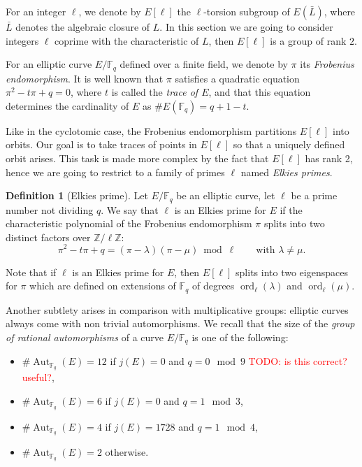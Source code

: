 \documentclass[12pt]{article}
\theoremstyle{plain}
\theoremstyle{definition}
\newtheorem{definition}[theorem]{Definition}
\newcommand{\todo}[1]{\textcolor{red}{TODO: #1}}
\DeclareMathOperator{\order}{ord} %
\DeclareMathOperator{\Aut}{Aut}
\def\Z{\ensuremath{\mathbb{Z}}}
\def\F{\ensuremath{\mathbb{F}}}
\begin{document}
For an integer $\ell$, we denote by $E[\ell]$ the $\ell$-torsion
subgroup of $E(\bar{L})$, where $\bar{L}$ denotes the algebraic
closure of $L$. In this section we are going to consider integers
$\ell$ coprime with the characteristic of $L$, then $E[\ell]$ is a
group of rank $2$.

For an elliptic curve $E/\F_q$ defined over a finite field, we denote
by $\pi$ its \emph{Frobenius endomorphism}. It is well known that
$\pi$ satisfies a quadratic equation $\pi^2-t\pi+q=0$, where $t$ is
called the \emph{trace of $E$}, and that this equation determines the
cardinality of $E$ as $\#E(\F_q)=q+1-t$.

Like in the cyclotomic case, the Frobenius endomorphism partitions
$E[\ell]$ into orbits. Our goal is to take traces of points in
$E[\ell]$ so that a uniquely defined orbit arises. This task is made
more complex by the fact that $E[\ell]$ has rank 2, hence we are going
to restrict to a family of primes $\ell$ named \emph{Elkies primes}.

\begin{definition}[Elkies prime]
  Let $E/\F_q$ be an elliptic curve, let $\ell$ be a prime number not
  dividing $q$.  We say that $\ell$ is an Elkies prime for $E$ if the
  characteristic polynomial of the Frobenius endomorphism $\pi$ splits
  into two distinct factors over $\Z/\ell\Z$:
\begin{equation}
\pi^2-t\pi+q=(\pi-\lambda)(\pi-\mu)\bmod\ell
\qquad\text{with $\lambda\ne\mu$}.
\end{equation}
\end{definition}

Note that if $\ell$ is an Elkies prime for $E$,
then $E[\ell]$ splits into two eigenspaces for $\pi$
which are defined on extensions of $\F_q$ of degrees
$\order_\ell(\lambda)$ and $\order_\ell(\mu)$.

Another subtlety arises in comparison with multiplicative groups:
elliptic curves always come with non trivial automorphisms. We recall
that the size of the \emph{group of rational automorphisms} of a curve
$E/\F_q$ is one of the following:
\begin{itemize}
\item $\#\Aut_{\F_q}(E) = 12$ if $j(E)=0$ and $q=0\mod 9$ \todo{is this correct? useful?},
\item $\#\Aut_{\F_q}(E) = 6$ if $j(E)=0$ and $q=1\mod 3$,
\item $\#\Aut_{\F_q}(E) = 4$ if $j(E)=1728$ and $q=1\mod 4$,
\item $\#\Aut_{\F_q}(E) = 2$ otherwise.
\end{itemize}
\end{document}
